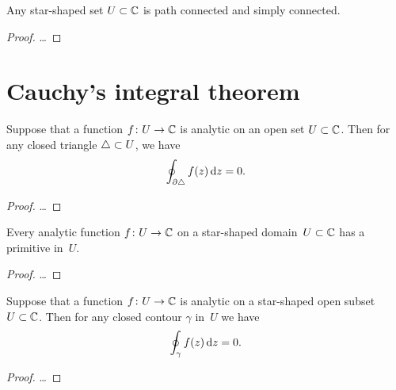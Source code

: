\begin{lemma}
  \label{lem:star_shaped_implies_simply_connected}
  Any star-shaped set $U \subset \mathbb{C}$ is path connected and simply connected.
\end{lemma}
\begin{proof}
  \ldots
\end{proof}



\section{Cauchy's integral theorem}

\begin{lemma}
  \label{lem:goursat}
  Suppose that a function $f \colon U \to \mathbb{C}$ is analytic on an open
  set $U \subset \mathbb{C}$.
  Then for any closed triangle $\triangle \subset U$, we have
  \begin{align*}
    \oint_{\partial \triangle} f(z) \, \mathrm{d} z = 0 .
  \end{align*}
\end{lemma}
\begin{proof}
  \ldots
\end{proof}

\begin{lemma}
  \label{lem:primitive_star_shaped}
  Every analytic function $f \colon U \to \mathbb{C}$ on a star-shaped
  domain~$U \subset \mathbb{C}$ has a primitive in~$U$.
\end{lemma}
\begin{proof}
  \ldots
\end{proof}

\begin{theorem}
  \label{thm:cauchy_theorem_star_shaped}
  Suppose that a function $f \colon U \to \mathbb{C}$ is analytic on a
  star-shaped open subset $U \subset \mathbb{C}$.
  Then for any closed contour $\gamma$ in~$U$ we have
  \begin{align*}
    \oint_\gamma f(z) \, \mathrm{d} z = 0 .
  \end{align*}
\end{theorem}
\begin{proof}
  \ldots
\end{proof}

